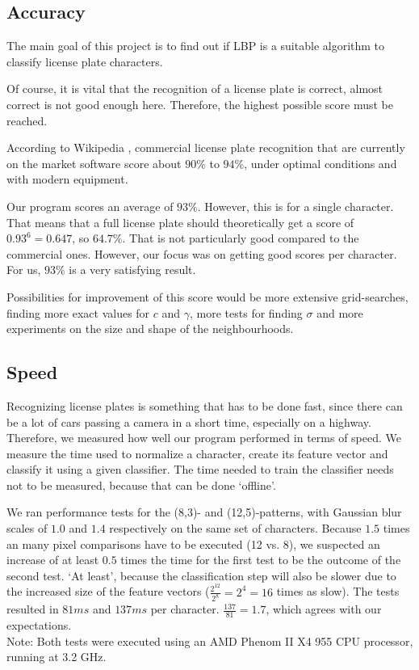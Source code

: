 \documentclass[a4paper]{article}
\begin{document}
\subsection{Accuracy}

The main goal of this project is to find out if LBP is a suitable algorithm to
classify license plate characters.

Of course, it is vital that the recognition of a license plate is correct,
almost correct is not good enough here. Therefore, the highest possible score
must be reached.

According to Wikipedia \cite{wikiplate}, commercial license plate recognition
that are currently on the market software score about $90\%$ to $94\%$, under
optimal conditions and with modern equipment.

Our program scores an average of $93\%$. However, this is for a single
character. That means that a full license plate should theoretically
get a score of $0.93^6 = 0.647$, so $64.7\%$. That is not particularly
good compared to the commercial ones. However, our focus was on getting
good scores per character. For us, $93\%$ is a very satisfying result.

Possibilities for improvement of this score would be more extensive
grid-searches, finding more exact values for $c$ and $\gamma$, more tests
for finding $\sigma$ and more experiments on the size and shape of the
neighbourhoods.

\subsection{Speed}

Recognizing license plates is something that has to be done fast, since there
can be a lot of cars passing a camera in a short time, especially on a highway.
Therefore, we measured how well our program performed in terms of speed. We
measure the time used to normalize a character, create its feature vector and
classify it using a given classifier. The time needed to train the classifier
needs not to be measured, because that can be done `offline'.

We ran performance tests for the (8,3)- and (12,5)-patterns, with Gaussian blur
scales of $1.0$ and $1.4$ respectively on the same set of characters. Because
$1.5$ times an many pixel comparisons have to be executed (12 vs. 8), we
suspected an increase of at least $0.5$ times the time for the first test to be
the outcome of the second test. `At least', because the classification step
will also be slower due to the increased size of the feature vectors
($\frac{2^{12}}{2^8} = 2^4 = 16$ times as slow). The tests resulted in $81ms$
and $137ms$ per character. $\frac{137}{81} = 1.7$, which agrees with our
expectations. \\
Note: Both tests were executed using an AMD Phenom II X4 955 CPU processor,
running at 3.2 GHz.
\end{document}
